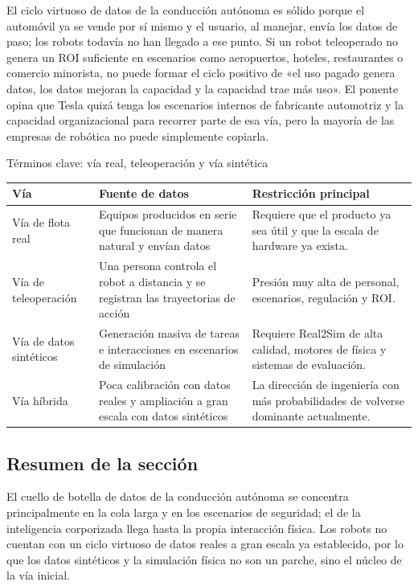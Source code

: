 \documentclass[a4paper]{article}
\begin{document}
El ciclo virtuoso de datos de la conducción autónoma es sólido porque el automóvil ya se vende por sí mismo y el usuario, al manejar, envía los datos de paso; los robots todavía no han llegado a ese punto. Si un robot teleoperado no genera un ROI suficiente en escenarios como aeropuertos, hoteles, restaurantes o comercio minorista, no puede formar el ciclo positivo de «el uso pagado genera datos, los datos mejoran la capacidad y la capacidad trae más uso». El ponente opina que Tesla quizá tenga los escenarios internos de fabricante automotriz y la capacidad organizacional para recorrer parte de esa vía, pero la mayoría de las empresas de robótica no puede simplemente copiarla.

\begin{knowledgebox}{Términos clave: vía real, teleoperación y vía sintética}
\begin{tabularx}{\textwidth}{p{}p{}X}
\toprule
Vía & Fuente de datos & Restricción principal \\
\midrule
Vía de flota real & Equipos producidos en serie que funcionan de manera natural y envían datos & Requiere que el producto ya sea útil y que la escala de hardware ya exista. \\
Vía de teleoperación & Una persona controla el robot a distancia y se registran las trayectorias de acción & Presión muy alta de personal, escenarios, regulación y ROI. \\
Vía de datos sintéticos & Generación masiva de tareas e interacciones en escenarios de simulación & Requiere Real2Sim de alta calidad, motores de física y sistemas de evaluación. \\
Vía híbrida & Poca calibración con datos reales y ampliación a gran escala con datos sintéticos & La dirección de ingeniería con más probabilidades de volverse dominante actualmente. \\
\bottomrule
\end{tabularx}
\end{knowledgebox}

\subsection{Resumen de la sección}

El cuello de botella de datos de la conducción autónoma se concentra principalmente en la cola larga y en los escenarios de seguridad; el de la inteligencia corporizada llega hasta la propia interacción física. Los robots no cuentan con un ciclo virtuoso de datos reales a gran escala ya establecido, por lo que los datos sintéticos y la simulación física no son un parche, sino el núcleo de la vía inicial.
\end{document}
